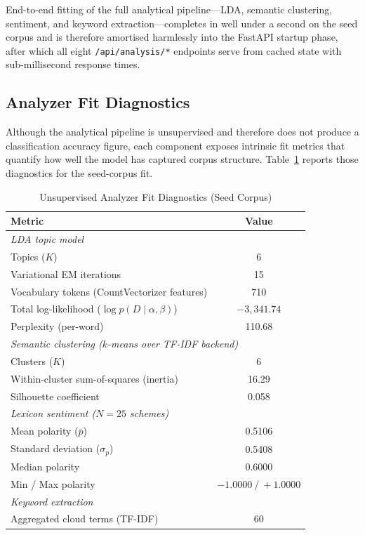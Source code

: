 \documentclass[10pt, journal, twocolumn]{IEEEtran}
\begin{document}
End-to-end fitting of the full analytical pipeline---LDA, semantic clustering, sentiment, and keyword extraction---completes in well under a second on the seed corpus and is therefore amortised harmlessly into the FastAPI startup phase, after which all eight \texttt{/api/analysis/*} endpoints serve from cached state with sub-millisecond response times.

\subsection{Analyzer Fit Diagnostics}
Although the analytical pipeline is unsupervised and therefore does not produce a classification accuracy figure, each component exposes intrinsic fit metrics that quantify how well the model has captured corpus structure. Table~\ref{tab:analyzer_diagnostics} reports those diagnostics for the seed-corpus fit.

\begin{table}[htbp]
\centering
\caption{Unsupervised Analyzer Fit Diagnostics (Seed Corpus)}
\label{tab:analyzer_diagnostics}
\begin{tabularx}{\linewidth}{@{}X c@{}}
\toprule
\textbf{Metric} & \textbf{Value} \\
\midrule
\multicolumn{2}{l}{\textit{LDA topic model}} \\
\quad Topics ($K$) & 6 \\
\quad Variational EM iterations & 15 \\
\quad Vocabulary tokens (CountVectorizer features) & 710 \\
\quad Total log-likelihood ($\log p(D \mid \alpha, \beta)$) & $-3{,}341.74$ \\
\quad Perplexity (per-word) & 110.68 \\
\midrule
\multicolumn{2}{l}{\textit{Semantic clustering ($k$-means over TF-IDF backend)}} \\
\quad Clusters ($K$) & 6 \\
\quad Within-cluster sum-of-squares (inertia) & 16.29 \\
\quad Silhouette coefficient & 0.058 \\
\midrule
\multicolumn{2}{l}{\textit{Lexicon sentiment ($N=25$ schemes)}} \\
\quad Mean polarity ($\overline{p}$) & 0.5106 \\
\quad Standard deviation ($\sigma_p$) & 0.5408 \\
\quad Median polarity & 0.6000 \\
\quad Min / Max polarity & $-1.0000\ /\ +1.0000$ \\
\midrule
\multicolumn{2}{l}{\textit{Keyword extraction}} \\
\quad Aggregated cloud terms (TF-IDF) & 60 \\
\bottomrule
\end{tabularx}
\end{table}
\end{document}
